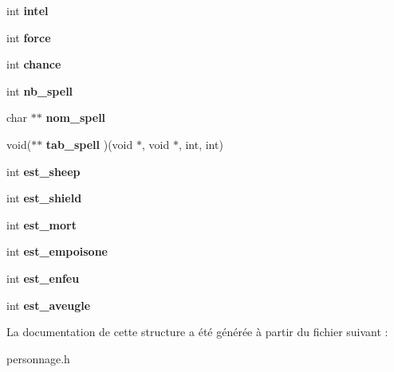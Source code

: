 \begin{DoxyCompactItemize}
int {\bfseries intel}
\item 
\mbox{\label{structpersonnage__s_a37d215db466673a5038530a299b128d6}} 
int {\bfseries force}
\item 
\mbox{\label{structpersonnage__s_a6aa70c6e90f17e92e6f2104e859f2877}} 
int {\bfseries chance}
\item 
\mbox{\label{structpersonnage__s_a539619f80372d4d291965f5e617a916c}} 
int {\bfseries nb\+\_\+spell}
\item 
\mbox{\label{structpersonnage__s_ab9d8f3c2563b277f1f60df0dac69a831}} 
char $\ast$$\ast$ {\bfseries nom\+\_\+spell}
\item 
\mbox{\label{structpersonnage__s_a57537963af9837b187ac439940bf8033}} 
void($\ast$$\ast$ {\bfseries tab\+\_\+spell} )(void $\ast$, void $\ast$, int, int)
\item 
\mbox{\label{structpersonnage__s_adb180a3452342c63fde618a74a562b61}} 
int {\bfseries est\+\_\+sheep}
\item 
\mbox{\label{structpersonnage__s_a410589f0eff83eb913aa3dae57ab237e}} 
int {\bfseries est\+\_\+shield}
\item 
\mbox{\label{structpersonnage__s_a62d51d06e320afa0afffa67249d177fb}} 
int {\bfseries est\+\_\+mort}
\item 
\mbox{\label{structpersonnage__s_a4ca45dd88f37f11979791f46663397ea}} 
int {\bfseries est\+\_\+empoisone}
\item 
\mbox{\label{structpersonnage__s_a4056010693d1e0e595275da41ded319e}} 
int {\bfseries est\+\_\+enfeu}
\item 
\mbox{\label{structpersonnage__s_aa6e35250bb53c64c2cbba45c3f8f1a77}} 
int {\bfseries est\+\_\+aveugle}
\end{DoxyCompactItemize}


La documentation de cette structure a été générée à partir du fichier suivant \+:\begin{DoxyCompactItemize}
\item 
personnage.\+h\end{DoxyCompactItemize}
